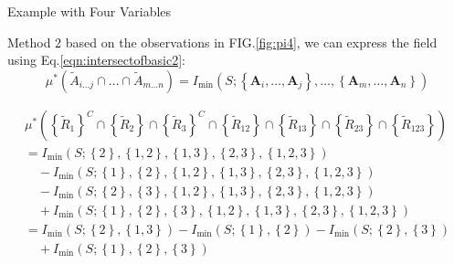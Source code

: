 \begin{frame}{Example with Four Variables}

\begin{block}{Method 2}
 based on the observations in FIG.\ref{fig:pi4}, we can express the field using Eq.\ref{eqn:intersectofbasic2}:
\begin{equation}
    \mu^{*}\left(\tilde{A}_{i \ldots j} \cap \ldots \cap \tilde{A}_{m \ldots n} \right) = I_{\min}\left(S; \left\{\mathbf{A}_i,\ldots,\mathbf{A}_j \right\}, \ldots,  \left\{\mathbf{A}_m,\ldots,\mathbf{A}_n \right\}\right)
    \label{eqn:intersectofbasic2}
\end{equation}

\[
\begin{array}{l}
   \mu^{*}\left( \left\{ \tilde{R}_1 \right\}^{C} \cap \left\{ \tilde{R}_2 \right\}\cap \left\{ \tilde{R}_3 \right\}^{C} \cap \left\{\tilde{R}_{12} \right\}\cap \left\{\tilde{R}_{13} \right\}\cap \left\{\tilde{R}_{23} \right\}\cap \left\{\tilde{R}_{123} \right\} \right)  \\
   
    =I_{\min} \left( S; \left\{ 2 \right\} ,\left\{ 1, 2 \right\} ,\left\{ 1, 3 \right\},\left\{ 2, 3 \right\},\left\{ 1, 2, 3 \right\}\right)  \\
     \quad- I_{\min} \left( S; \left\{ 1 \right\} ,\left\{ 2 \right\} ,\left\{ 1, 2 \right\} ,\left\{ 1, 3 \right\},\left\{ 2, 3 \right\},\left\{ 1, 2, 3 \right\}\right) \\
    \quad - I_{\min} \left( S; \left\{ 2 \right\} ,\left\{ 3 \right\} ,\left\{ 1, 2 \right\} ,\left\{ 1, 3 \right\},\left\{ 2, 3 \right\},\left\{ 1, 2, 3 \right\}\right) \\
     \quad+I_{\min} \left( S; \left\{ 1 \right\} ,\left\{ 2 \right\} ,\left\{ 3 \right\} ,\left\{ 1, 2 \right\} ,\left\{ 1, 3 \right\},\left\{ 2, 3 \right\},\left\{ 1, 2, 3 \right\}\right)\\
    =I_{\min} \left( S; \left\{ 2 \right\} ,\left\{ 1, 3 \right\}\right)  - I_{\min} \left( S; \left\{ 1 \right\} ,\left\{ 2 \right\} \right) - I_{\min} \left( S; \left\{ 2 \right\} ,\left\{ 3 \right\} \right) \\
    \quad+I_{\min} \left( S; \left\{ 1 \right\} ,\left\{ 2 \right\} ,\left\{ 3 \right\} \right)
\end{array}
\]
\end{block}


\end{frame}
